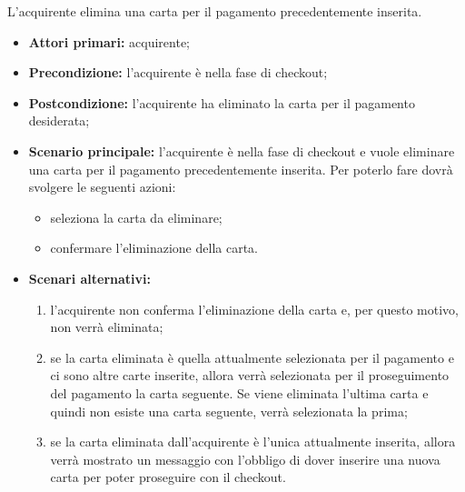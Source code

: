 L'acquirente elimina una carta per il pagamento precedentemente inserita.
\begin{itemize}
    \item \textbf{Attori primari:} acquirente;
    \item \textbf{Precondizione:} l'acquirente è nella fase di checkout;
    \item \textbf{Postcondizione:} l'acquirente ha eliminato la carta per il pagamento desiderata;
    \item \textbf{Scenario principale:} l'acquirente è nella fase di checkout e vuole eliminare una carta per il pagamento precedentemente inserita. Per poterlo fare dovrà svolgere le seguenti azioni:
        \begin{itemize}
            \item seleziona la carta da eliminare;
            \item confermare l'eliminazione della carta.
        \end{itemize}
    \item \textbf{Scenari alternativi:}
    \begin{enumerate}[label=\lett]
        \item l'acquirente non conferma l'eliminazione della carta e, per questo motivo, non verrà eliminata;
        \item se la carta eliminata è quella attualmente selezionata per il pagamento e ci sono altre carte inserite, allora verrà selezionata per il proseguimento del pagamento la carta seguente. Se viene eliminata l'ultima carta e quindi non esiste una carta seguente, verrà selezionata la prima;
        \item se la carta eliminata dall'acquirente è l'unica attualmente inserita, allora verrà mostrato un messaggio con l'obbligo di dover inserire una nuova carta per poter proseguire con il checkout.
    \end{enumerate}
\end{itemize}



